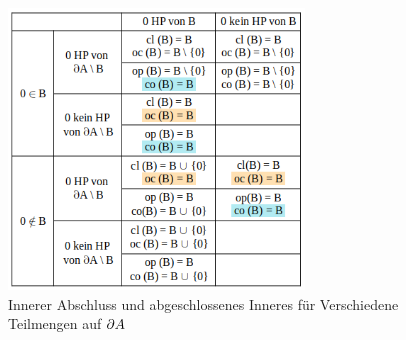     \begin{figure}[ht]
        \centering
        \includegraphics[width=0.7\textwidth]{gfx/tab-standardbsp.png}
        \caption{Innerer Abschluss und abgeschlossenes Inneres für Verschiedene Teilmengen auf $\partial A$}
        \label{fig:tab-standardbsp}
    \end{figure}
    
    
